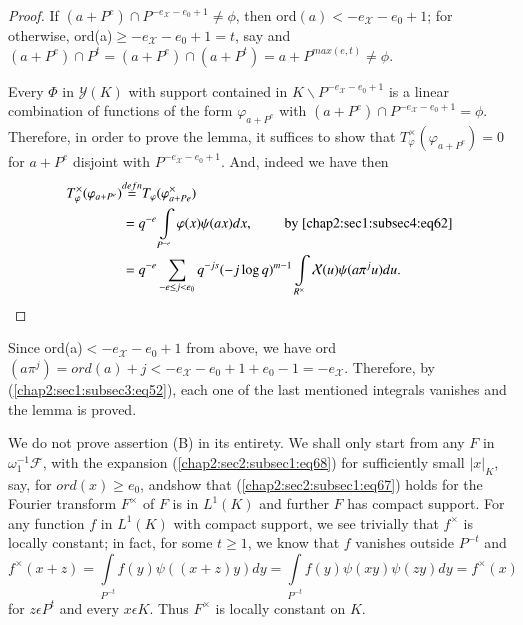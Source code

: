 \begin{proof}
If $(a+P^{e})\cap P^{-e_{\mathcal{X}}-e_{0}+1}\neq \phi$, then
ord$(a)<-e_{\mathcal{X}}-e_{0}+1$; for otherwise,
ord(a)$\ge-e_{\mathcal{X}}-e_{0}+1=t$, say and
  $(a+P^{e})\cap P^{t}=(a+P^{e})\cap(a+P^{t})=a+P^{max(e,t)}\neq
\phi$.

 Every $\Phi$ in $\mathscr{Y}(K)$ with support contained in
 $K\backslash P^{-e_{\mathcal{X}}-e_{0}+1}$ is a linear combination of
 functions of the form $\varphi_{a+P^{e}}$ with $(a+P^{e})\cap
 P^{-e_{\mathcal{X}}-e_{0}+1}=\phi$.
 Therefore, in order to prove the lemma, it suffices to show that
 $T_{\varphi}^{\times}(\varphi_{a+P^{e}})=0$ for $a+P^{e}$ disjoint with
 $P^{-e_{\mathcal{X}}-e_{0}+1}$. And,  indeed we have then
\begin{align*}
  T_{\varphi}^{\times}(\varphi_{a+P^{e}})
  & {\displaystyle{\mathop{=}^{defn}}} 
  T_{\varphi}(\varphi_{a+Pe}^{\times})\\
  & =q^{-e}\int\limits_{P^{-e}}\varphi(x)\psi (ax)dx,\qquad
  \text{ by \ref{chap2:sec1:subsec4:eq62}}\\
  & =q^{-e}\sum\limits_{-e \le j <e_{0}}q^{-js}(-j \log
  q)^{m-1}\int\limits_{R^{\times}}\mathcal{X}(u)\psi(a \pi^{j} u)du.
\end{align*}
\end{proof}

Since ord(a)$<-e_{\mathcal{X}}-e_{0}+1$ from above, we have ord $(a
\pi^{j})=ord(a)+j<-e_{\mathcal{X}}-e_{0}+1+e_{0}-1=-e_{\mathcal{X}}$. Therefore,
by (\ref{chap2:sec1:subsec3:eq52}), each one of the last mentioned
integrals vanishes and the lemma is proved.


 We do not prove assertion (B) in its entirety. We shall only start
 from any $F$ in $\omega_{1}^{-1}\mathscr{F}$, with the expansion
 (\ref{chap2:sec2:subsec1:eq68}) for sufficiently small $|x|_{K}$,
 say, for $ord(x)\ge e_{0}$,  and\pageoriginale show that
 (\ref{chap2:sec2:subsec1:eq67}) holds for the Fourier transform
 $F^{\times}$ of 
 $F$ is in $L^{1}(K)$ and further $F$ has compact support. For any
 function $f$ in $L^1(K)$ with compact support, we see trivially that
   $f^{\times}$ is locally constant; in fact, for some $t\ge 1$, we know
   that $f$ vanishes outside $P^{-t}$ and 
\begin{equation*}
  f^{\times}(x+z)=\int\limits_{P^{-t}}f(y)\psi((x+z)y)dy =
  \int\limits_{P^{-t}}f(y)\psi(xy)\psi(zy)dy=f^{\times}(x)
\end{equation*}
  for $z\epsilon P^{t}$ and every $x\epsilon K$. Thus $F^{\times}$ is
  locally constant on $K$. 

